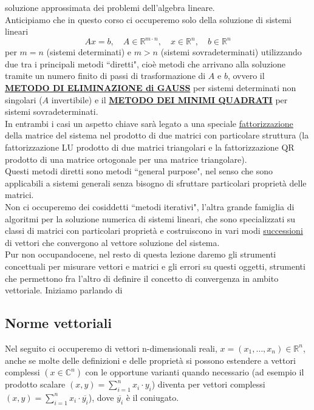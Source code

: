 \documentclass[12pt,a4paper]{article}
\begin{document}
soluzione approssimata dei problemi dell'algebra lineare.\\
Anticipiamo che in questo corso ci occuperemo solo della soluzione di sistemi lineari
\begin{equation*}
    Ax=b,\quad A\in\mathbb{R}^{m\cdot n}, \quad x\in\mathbb{R}^n,\quad b\in\mathbb{R}^n
\end{equation*}
per $m=n$ (sistemi determinati) e $m>n$ (sistemi sovradeterminati) utilizzando due tra i principali metodi ``diretti", cioè metodi che arrivano alla soluzione tramite un numero finito di passi di trasformazione di $A$ e $b$, ovvero il \uline{\textbf{METODO DI ELIMINAZIONE di GAUSS}} per sistemi determinati
non singolari ($A$ invertibile) e il \uline{\textbf{METODO DEI MINIMI QUADRATI}} per sistemi sovradeterminati.\\In entrambi i casi un aspetto chiave sarà legato a una speciale \uline{fattorizzazione} della matrice del sistema nel prodotto di due matrici con particolare struttura (la fattorizzazione LU prodotto di due matrici triangolari e la fattorizzazione QR prodotto di una matrice ortogonale per una matrice triangolare).\\Questi metodi diretti sono metodi
``general purpose", nel senso che sono applicabili a sistemi generali senza bisogno di sfruttare particolari proprietà delle matrici.\\Non ci occuperemo dei cosiddetti ``metodi iterativi", l'altra grande famiglia di algoritmi per la soluzione numerica di sistemi lineari, che sono specializzati su classi di matrici con particolari proprietà e costruiscono in vari modi \uline{successioni} di vettori che convergono al vettore soluzione del sistema.\\Pur non occupandocene, nel
resto di questa lezione daremo gli strumenti concettuali per misurare vettori e matrici e gli errori su questi oggetti, strumenti che permettono fra l'altro di definire il concetto di convergenza in ambito vettoriale. Iniziamo parlando di

\subsection{Norme vettoriali}
Nel seguito ci occuperemo di vettori n-dimensionali reali, $x = (x_1, \dotso, x_n) \in \mathbb{R}^n$, anche se molte delle definizioni e delle proprietà si possono estendere
a vettori complessi $(x \in \mathbb{C}^n)$ con le opportune varianti quando necessario (ad esempio il prodotto scalare $(x,y) = \sum\limits_{i=1}^n x_i \cdot y_i$) diventa per vettori complessi $(x,y) = \sum\limits_{i=1}^n x_i \cdot \overline{y_i}$), dove $\overline{y_i}$ è il coniugato.
\end{document}
